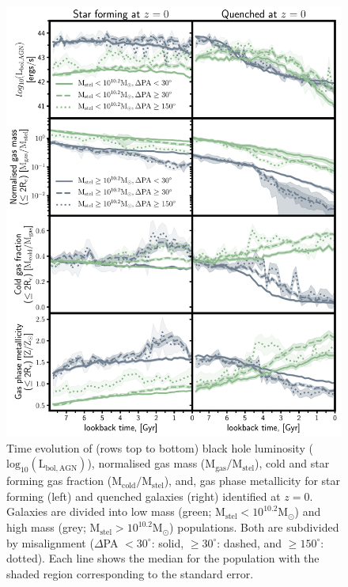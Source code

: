 \begin{figure}
	\includegraphics[width=\linewidth]{misalignment_BH/time_evo_letter_without_BH_props_median.pdf}
    \caption{Time evolution of (rows top to bottom) black hole luminosity ($\mathrm{log_{10}(L_{bol, AGN})}$), normalised gas mass ($\mathrm{M_{gas}/M_{stel}}$), cold and star forming gas fraction ($\mathrm{M_{cold}/M_{stel}}$), and, gas phase metallicity for star forming (left) and quenched galaxies (right) identified at $z=0$. Galaxies are divided into low mass (green; $\mathrm{M_{stel} < 10^{10.2}M_{\odot}}$) and high mass (grey; $\mathrm{M_{stel} > 10^{10.2}M_{\odot}}$) populations. Both are subdivided by misalignment ($\Delta$PA $< 30^{\circ}$: solid, $\geq 30^{\circ}$: dashed, and  $\geq 150^{\circ}$: dotted). Each line shows the median for the population with the shaded region corresponding to the standard error.}
    \label{fig:overall_pop}
\end{figure}

